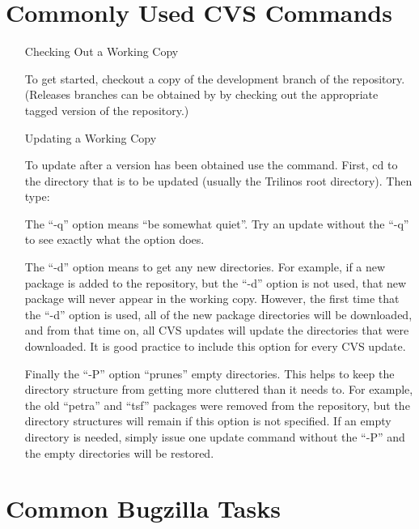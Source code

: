 \documentclass[12pt,relax]{TrilinosDevGuide}
\begin{document}
\section{Commonly Used CVS Commands}
\label{Section:CVS}
\begin{itemize}

\item[Checking Out a Working Copy]

To get started, checkout a copy of the development branch of the repository.
(Releases branches can be obtained by by checking out the appropriate 
tagged version of the repository.)


\item[Updating a Working Copy]

To update after a version has been obtained use the  
command.  First, cd to the directory that is to be updated (usually the 
Trilinos root directory).  Then type:


The ``-q'' option means ``be somewhat quiet''.  Try an update without the 
``-q'' to see exactly what the option does.  

The ``-d'' option means to get any new directories.  For example, if a new 
package is added to the repository, but the ``-d'' option is not used, that 
new package will never appear in the working copy.  However, the first time 
that the ``-d'' option is used, all of the new package directories will be 
downloaded, and from that time on, all CVS updates will update the 
directories that were downloaded.  It is good practice to include this 
option for every CVS update.

Finally the ``-P'' option ``prunes'' empty directories.  This helps to keep 
the directory structure from getting more cluttered than it needs to.  For 
example, the old ``petra'' and ``tsf'' packages were removed from the 
repository, but the directory structures will remain if this option is not 
specified.  If an empty directory is needed, simply issue one update 
command without the ``-P'' and the empty directories will be restored.





\end{itemize}

\section{Common Bugzilla Tasks}
\label{Section:Bugzilla}
\end{document}
